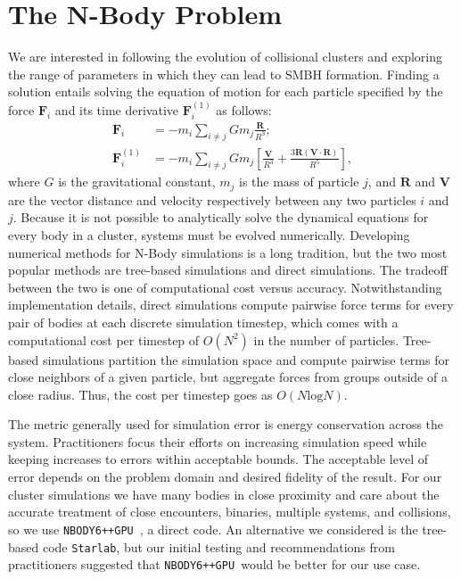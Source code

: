 \documentclass{princeton_astro_thesis}
\newcommand\nbody{\texttt{NBODY6++GPU }}
\numberwithin{equation}{section}
\begin{document}
\section{The N-Body Problem}
We are interested in following the evolution of collisional clusters and exploring the range of parameters in which they can lead to \ac{SMBH} formation. Finding a solution entails solving the equation of motion for each particle specified by the force $\mathbf{F}_{i}$ and its time derivative $\mathbf{F}^{(1)}_{i}$ as follows:
\begin{subequations}
    \begin{align}
    \mathbf{F}_{i} &= -m_{i}\sum_{i \neq j} Gm_{j} \frac{\mathbf{R}}{R^3}; \\
    \mathbf{F}^{(1)}_{i} &=  -m_{i}\sum_{i \neq j} Gm_{j} \left[ \frac{\mathbf{V}}{R^3} + \frac{3\mathbf{R}(\mathbf{V} \cdot \mathbf{R})}{R^5}\right],
    \end{align}
    \label{eqn:gravmotion}
\end{subequations}
where $G$ is the gravitational constant, $m_j$ is the mass of particle $j$, and $\mathbf{R}$ and $\mathbf{V}$ are the vector distance and velocity respectively between any two particles $i$ and $j$.  Because it is not possible to analytically solve the dynamical equations for every body in a cluster, systems must be evolved numerically. Developing numerical methods for N-Body simulations is a long tradition, but the two most popular methods are tree-based simulations and direct simulations. The tradeoff between the two is one of computational cost versus accuracy. Notwithstanding implementation details, direct simulations compute pairwise force terms for every pair of bodies at each discrete simulation timestep, which comes with a computational cost per timestep of $O(N^2)$ in the number of particles.  Tree-based simulations partition the simulation space and compute pairwise terms for close neighbors of a given particle, but aggregate forces from groups outside of a close radius. Thus, the cost per timestep goes as $O(N\mathrm{log}N)$.

The metric generally used for simulation error is energy conservation across the system. Practitioners focus their efforts on increasing simulation speed while keeping increases to errors within acceptable bounds. The acceptable level of error depends on the problem domain and desired fidelity of the result.  For our cluster simulations we have many bodies in close proximity and care about the accurate treatment of close encounters, binaries, multiple systems, and collisions, so we use \nbody, a direct code.  An alternative we considered is the tree-based code \texttt{Starlab}, but our initial testing and recommendations from practitioners suggested that \nbody would be better for our use case.
\end{document}

